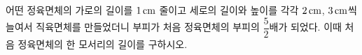 어떤 정육면체의 가로의 길이를 $1\mkern3mu \mathrm{cm}$ 줄이고 세로의 길이와 높이를 각각 $2\mkern3mu \mathrm{cm}$, $3\mkern3mu \mathrm{cm}$씩 늘여서 직육면체를 만들었더니 부피가 처음 정육면체의 부피의 $\dfrac{5}{2}$배가 되었다. 이때 처음 정육면체의 한 모서리의 길이를 구하시오. 
